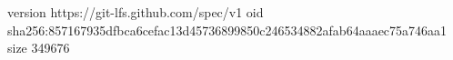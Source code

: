 version https://git-lfs.github.com/spec/v1
oid sha256:857167935dfbca6cefac13d45736899850c246534882afab64aaaec75a746aa1
size 349676
